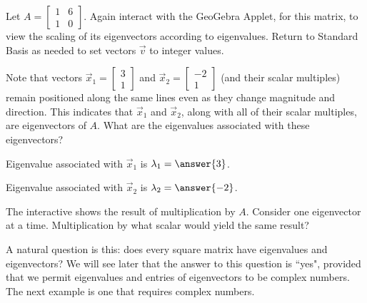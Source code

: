 \documentclass{ximera}
\begin{document}
\begin{exploration}\label{exp:eigenvectors}
Let $A=\begin{bmatrix}1&6\\1&0\end{bmatrix}$.  Again interact with the GeoGebra Applet, for this matrix, to view the scaling of its eigenvectors according to eigenvalues. Return to Standard Basis as needed to set vectors $\vec{v}$ to integer values.
    
    
\begin{center}
\end{center}
    
\begin{question}
Note that vectors $\vec{x}_1=\begin{bmatrix}3\\1\end{bmatrix}$ and $\vec{x}_2=\begin{bmatrix}-2\\1\end{bmatrix}$ (and their scalar multiples) remain positioned along the same lines even as they change magnitude and direction.  This indicates that $\vec{x}_1$ and $\vec{x}_2$, along with all of their scalar multiples, are eigenvectors of $A$.  What are the eigenvalues associated with these eigenvectors?
    
Eigenvalue associated with $\vec{x}_1$ is $\lambda_1=\answer{3}$.
    
Eigenvalue associated with $\vec{x}_2$ is $\lambda_2=\answer{-2}$.
    
\begin{hint}
    The interactive shows the result of multiplication by $A$.
    Consider one eigenvector at a time.  Multiplication by what scalar would yield the same result?
\end{hint}
\end{question}
\end{exploration}
    
    
A natural question is this: does every square matrix have eigenvalues and eigenvectors?  We will see later that the answer to this question is ``yes", provided that we permit eigenvalues and entries of eigenvectors to be complex numbers.  The next example is one that requires complex numbers.
    
\end{document}
